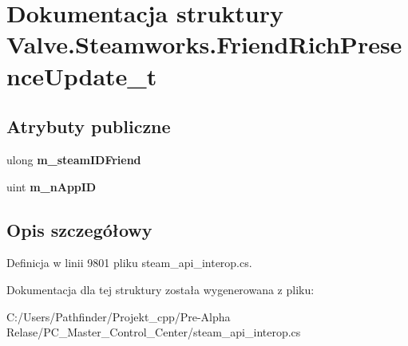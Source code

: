 \hypertarget{struct_valve_1_1_steamworks_1_1_friend_rich_presence_update__t}{}\section{Dokumentacja struktury Valve.\+Steamworks.\+Friend\+Rich\+Presence\+Update\+\_\+t}
\label{struct_valve_1_1_steamworks_1_1_friend_rich_presence_update__t}
\subsection*{Atrybuty publiczne}
\begin{DoxyCompactItemize}
\item 
\mbox{\label{struct_valve_1_1_steamworks_1_1_friend_rich_presence_update__t_a35d6e387ca686d87728d3845a9e453d8}} 
ulong {\bfseries m\+\_\+steam\+I\+D\+Friend}
\item 
\mbox{\label{struct_valve_1_1_steamworks_1_1_friend_rich_presence_update__t_a8e2effca513cfd66c5cf424d924c4dfd}} 
uint {\bfseries m\+\_\+n\+App\+ID}
\end{DoxyCompactItemize}


\subsection{Opis szczegółowy}


Definicja w linii 9801 pliku steam\+\_\+api\+\_\+interop.\+cs.



Dokumentacja dla tej struktury została wygenerowana z pliku\+:\begin{DoxyCompactItemize}
\item 
C\+:/\+Users/\+Pathfinder/\+Projekt\+\_\+cpp/\+Pre-\/\+Alpha Relase/\+P\+C\+\_\+\+Master\+\_\+\+Control\+\_\+\+Center/steam\+\_\+api\+\_\+interop.\+cs\end{DoxyCompactItemize}
